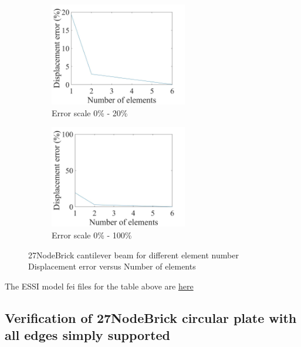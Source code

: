 \documentclass[fleqn,11pt,letter]{article}
\begin{document}
\begin{figure}[H]
  \begin{subfigure}{0.5\textwidth}
    \centering
    \includegraphics[width=6cm]{../Figure_files/27NodeBrick/error27brick_beam_different_element_number.jpeg}
    \caption{Error scale 0\% - 20\%}
  \end{subfigure}
  \begin{subfigure}{0.5\textwidth}
    \centering
    \includegraphics[width=6cm]{../Figure_files/27NodeBrick/error27brick_beam_different_element_number100.jpeg}
    \caption{Error scale 0\% - 100\%}
  \end{subfigure}
  \captionsetup{justification=centering,margin=2cm}
  \caption{27NodeBrick cantilever beam for different element number\\
    Displacement error   versus   Number of elements}
  \label{fig error 27NodeBrick cantilever beam for different element number}
\end{figure}


The ESSI model fei files for the table above are \href{https://github.com/yuan-energy/ESSI_Verification/blob/master/27NodeBrick/cantilever_different_element_number/cantilever_different_element_number.tar.gz?raw=true}{here}






\newpage
\subsection{Verification of 27NodeBrick circular plate with all edges simply supported}
\end{document}

